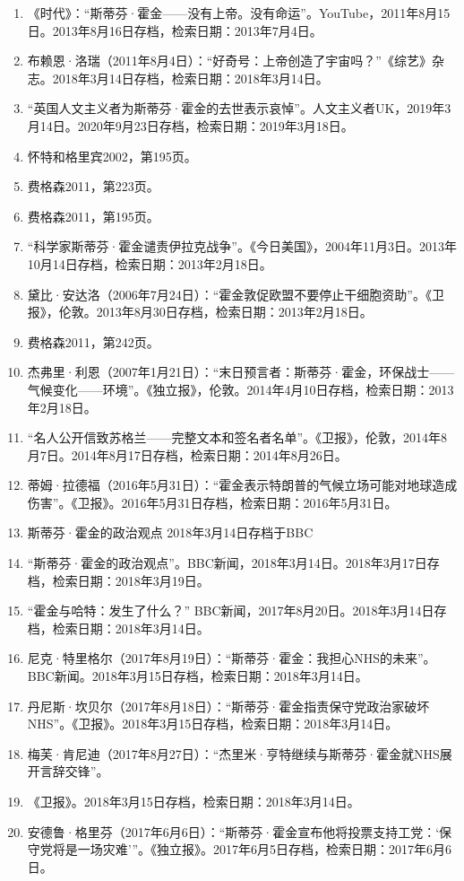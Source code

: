 \begin{enumerate}
\item 《时代》：“斯蒂芬·霍金——没有上帝。没有命运”。YouTube，2011年8月15日。2013年8月16日存档，检索日期：2013年7月4日。
\item 布赖恩·洛瑞（2011年8月4日）：“好奇号：上帝创造了宇宙吗？”《综艺》杂志。2018年3月14日存档，检索日期：2018年3月14日。
\item “英国人文主义者为斯蒂芬·霍金的去世表示哀悼”。人文主义者UK，2019年3月14日。2020年9月23日存档，检索日期：2019年3月18日。
\item 怀特和格里宾2002，第195页。
\item 费格森2011，第223页。
\item 费格森2011，第195页。
\item “科学家斯蒂芬·霍金谴责伊拉克战争”。《今日美国》，2004年11月3日。2013年10月14日存档，检索日期：2013年2月18日。
\item 黛比·安达洛（2006年7月24日）：“霍金敦促欧盟不要停止干细胞资助”。《卫报》，伦敦。2013年8月30日存档，检索日期：2013年2月18日。
\item 费格森2011，第242页。
\item 杰弗里·利恩（2007年1月21日）：“末日预言者：斯蒂芬·霍金，环保战士——气候变化——环境”。《独立报》，伦敦。2014年4月10日存档，检索日期：2013年2月18日。
\item “名人公开信致苏格兰——完整文本和签名者名单”。《卫报》，伦敦，2014年8月7日。2014年8月17日存档，检索日期：2014年8月26日。
\item 蒂姆·拉德福（2016年5月31日）：“霍金表示特朗普的气候立场可能对地球造成伤害”。《卫报》。2016年5月31日存档，检索日期：2016年5月31日。
\item 斯蒂芬·霍金的政治观点 2018年3月14日存档于BBC
\item “斯蒂芬·霍金的政治观点”。BBC新闻，2018年3月14日。2018年3月17日存档，检索日期：2018年3月19日。
\item “霍金与哈特：发生了什么？” BBC新闻，2017年8月20日。2018年3月14日存档，检索日期：2018年3月14日。
\item 尼克·特里格尔（2017年8月19日）：“斯蒂芬·霍金：我担心NHS的未来”。BBC新闻。2018年3月15日存档，检索日期：2018年3月14日。
\item 丹尼斯·坎贝尔（2017年8月18日）：“斯蒂芬·霍金指责保守党政治家破坏NHS”。《卫报》。2018年3月15日存档，检索日期：2018年3月14日。
\item 梅芙·肯尼迪（2017年8月27日）：“杰里米·亨特继续与斯蒂芬·霍金就NHS展开言辞交锋”。\item 《卫报》。2018年3月15日存档，检索日期：2018年3月14日。
\item 安德鲁·格里芬（2017年6月6日）：“斯蒂芬·霍金宣布他将投票支持工党：‘保守党将是一场灾难’”。《独立报》。2017年6月5日存档，检索日期：2017年6月6日。

\end{enumerate}
